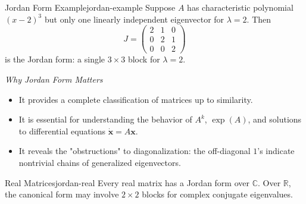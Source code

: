 \begin{example}{Jordan Form Example}{jordan-example}
    Suppose \(A\) has characteristic polynomial \((x-2)^3\) but only one linearly independent eigenvector for \(\lambda=2\). Then
    \[
        J =
        \begin{pmatrix}
            2 & 1 & 0 \\
            0 & 2 & 1 \\
            0 & 0 & 2
        \end{pmatrix}
    \]
    is the Jordan form: a single \(3 \times 3\) block for \(\lambda=2\).
\end{example}

\emph{Why Jordan Form Matters}

\begin{itemize}[nosep]
    \item It provides a complete classification of matrices up to similarity.
    \item It is essential for understanding the behavior of \(A^k\), \(\exp(A)\), and solutions to differential equations \(\dot{\mathbf{x}} = A\mathbf{x}\).
    \item It reveals the "obstructions" to diagonalization: the off-diagonal \(1\)'s indicate nontrivial chains of generalized eigenvectors.
\end{itemize}

\begin{remark}{Real Matrices}{jordan-real}
    Every real matrix has a Jordan form over \(\mathbb{C}\). Over \(\mathbb{R}\), the canonical form may involve \(2 \times 2\) blocks for complex conjugate eigenvalues.
\end{remark}

